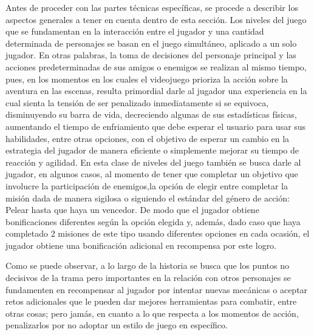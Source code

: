 \documentclass{article}
\begin{document}
Antes de proceder con las partes técnicas específicas, se procede a describir los aspectos generales a tener en cuenta dentro de esta sección. Los niveles del juego que se fundamentan en la interacción entre el jugador y una cantidad determinada de personajes se basan en el juego simultáneo, aplicado a un solo jugador. En otras palabras, la toma de decisiones del personaje principal y las acciones predeterminadas de sus amigos o enemigos se realizan al mismo tiempo\cite{Simultaneous}, pues, en los momentos en los cuales el videojuego prioriza la acción sobre la aventura en las escenas, resulta primordial darle al jugador una experiencia en la cual sienta la tensión de ser penalizado inmediatamente si se equivoca, disminuyendo su barra de vida, decreciendo algunas de sus estadísticas físicas, aumentando el tiempo de enfriamiento que debe esperar el usuario para usar sus habilidades, entre otras opciones, con el objetivo de esperar un cambio en la estrategia del jugador de manera eficiente o simplemente mejorar su tiempo de reacción y agilidad. En esta clase de niveles del juego también se busca darle al jugador, en algunos casos, al momento de tener que completar un objetivo que involucre la participación de enemigos,la opción de elegir entre completar la misión dada de manera sigilosa o siguiendo el estándar del género de acción: Pelear hasta que haya un vencedor. De modo que el jugador obtiene bonificaciones diferentes según la opción elegida y, además, dado caso que haya completado 2 misiones de este tipo usando diferentes opciones en cada ocasión, el jugador obtiene una bonificación adicional en recompensa por este logro.

Como se puede observar, a lo largo de la historia se busca que los puntos no decisivos de la trama pero importantes en la relación con otros personajes se fundamenten en recompensar al jugador por intentar nuevas mecánicas o aceptar retos adicionales que le pueden dar mejores herramientas para combatir, entre otras cosas; pero jamás, en cuanto a lo que respecta a los momentos de acción, penalizarlos por no adoptar un estilo de juego en específico.
\end{document}
